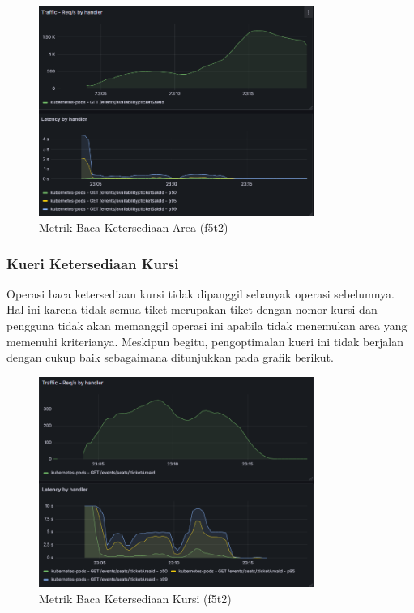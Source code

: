 \begin{figure}[htbp]
    \centering
    \includegraphics[width=0.8\textwidth]{resources/chapter-4/latency-area-availability.png}
    \caption{Metrik Baca Ketersediaan Area (f5t2)}
    \label{fig:latency-get-area}
\end{figure}

\subsubsection{Kueri Ketersediaan Kursi}

Operasi baca ketersediaan kursi tidak dipanggil sebanyak operasi sebelumnya. Hal ini karena tidak semua tiket merupakan tiket dengan nomor kursi dan pengguna tidak akan memanggil operasi ini apabila tidak menemukan area yang memenuhi kriterianya. Meskipun begitu, pengoptimalan kueri ini tidak berjalan dengan cukup baik sebagaimana ditunjukkan pada grafik berikut.

\begin{figure}[htbp]
    \centering
    \includegraphics[width=0.8\textwidth]{resources/chapter-4/latency-seat-availability.png}
    \caption{Metrik Baca Ketersediaan Kursi (f5t2)}
    \label{fig:latency-get-seat}
\end{figure}

